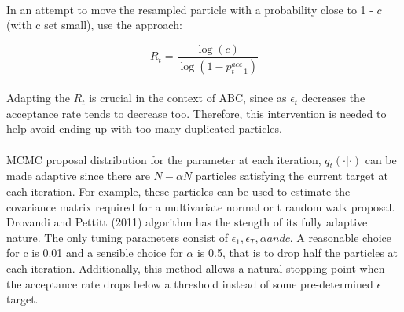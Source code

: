 \documentclass[12,fleqn]{article}
\theoremstyle{definition}
\theoremstyle{plain}
\begin{document}
\paragraph{}
In an attempt to move the resampled particle with a probability close to 1 - $c$ (with c set small),  use the approach:
\par
\begin{equation*}
R_t = \frac{\log(c)}{\log(1 - p^{acc}_{t - 1})}
\end{equation*}
\paragraph{}
Adapting the $R_t$ is crucial in the context of ABC, since as $\epsilon_t$ decreases the acceptance rate tends to decrease too.  Therefore, this intervention is needed to help avoid ending up with too many duplicated particles. 
\par

\paragraph{}
MCMC proposal distribution for the parameter at each iteration, $q_t(\cdot | \cdot)$ can be made adaptive since there are $N - \alpha N$ particles satisfying the current target at each iteration. For example, these particles can be used to estimate the covariance matrix required for a multivariate normal or t random walk proposal. Drovandi and Pettitt (2011) algorithm has the stength of its fully adaptive nature. The only tuning parameters consist of $\epsilon_1, \epsilon_T, \alpha and c$. A reasonable choice for c is 0.01 and a sensible choice for $\alpha$ is 0.5, that is to drop half the particles at each iteration. Additionally, this method allows a natural stopping point when the acceptance rate drops below a threshold instead of some pre-determined $\epsilon$ target.  
\par
\end{document}

